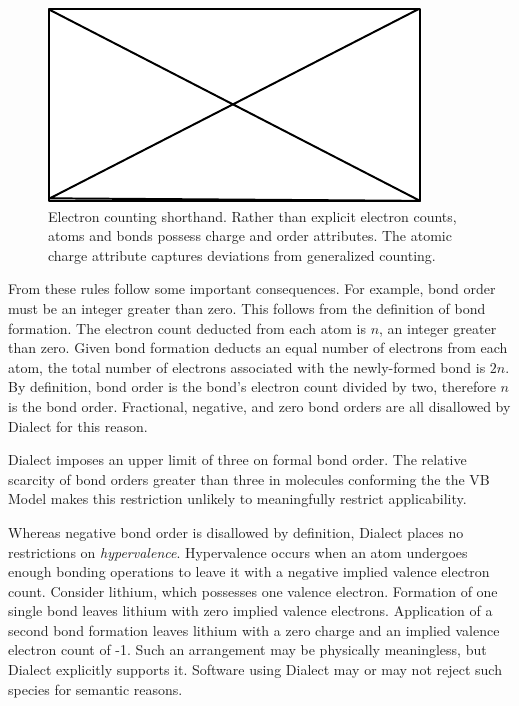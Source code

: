 \documentclass{article}
\begin{document}
\begin{figure}
    \centering
    \includegraphics{filler}
    \caption{Electron counting shorthand. Rather than explicit electron counts, atoms and bonds possess charge and order attributes. The atomic charge attribute captures deviations from generalized counting.}
    \label{fig:electron-counting-shorthand}
\end{figure}

From these rules follow some important consequences. For example, bond order must be an integer greater than zero. This follows from the definition of bond formation. The electron count deducted from each atom is $n$, an integer greater than zero. Given bond formation deducts an equal number of electrons from each atom, the total number of electrons associated with the newly-formed bond is $2n$. By definition, bond order is the bond's electron count divided by two, therefore $n$ is the bond order. Fractional, negative, and zero bond orders are all disallowed by Dialect for this reason.

Dialect imposes an upper limit of three on formal bond order. The relative scarcity of bond orders greater than three in molecules conforming the the VB Model makes this restriction unlikely to meaningfully restrict applicability.

Whereas negative bond order is disallowed by definition, Dialect places no restrictions on \textit{hypervalence}. Hypervalence occurs when an atom undergoes enough bonding operations to leave it with a negative implied valence electron count. Consider lithium, which possesses one valence electron. Formation of one single bond leaves lithium with zero implied valence electrons. Application of a second bond formation leaves lithium with a zero charge and an implied valence electron count of -1. Such an arrangement may be physically meaningless, but Dialect explicitly supports it. Software using Dialect may or may not reject such species for semantic reasons.
\end{document}
